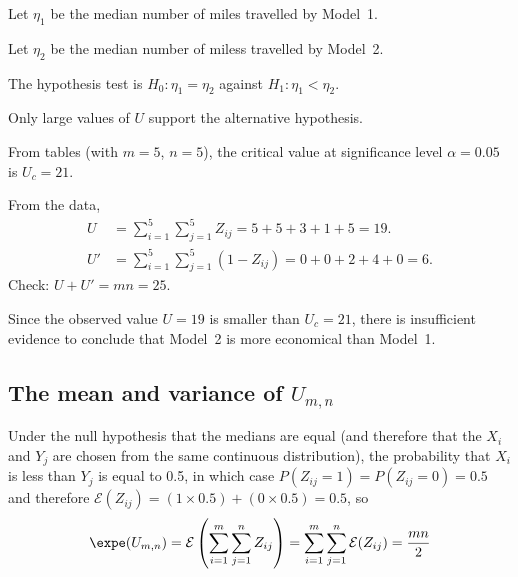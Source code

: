 \begin{solution}
Let $\eta_1$ be the median number of miles travelled by Model~1.
\par
Let $\eta_2$ be the median number of miless travelled by Model~2.
\par
The hypothesis test is $H_0:\eta_1=\eta_2$ against $H_1:\eta_1 < \eta_2$.
\par
Only large values of $U$ support the alternative hypothesis. 
\par 
From tables (with $m=5$, $n=5$), the critical value at significance level $\alpha=0.05$ is $U_c=21$. 
\par
From the data,
\begin{align*}
U 		& = \sum_{i=1}^5\sum_{j=1}^5 Z_{ij} = 5 + 5 + 3 + 1 + 5 = 19. \\
U'		& = \sum_{i=1}^5\sum_{j=1}^5 (1-Z_{ij}) = 0 + 0 + 2 + 4 + 0 = 6.
\end{align*}
Check: $U + U' = mn = 25$. 
\par
Since the observed value $U=19$ is smaller than $U_c=21$, there is insufficient evidence to conclude that Model~2 is more economical than Model~1. 

\end{solution}

\subsection{The mean and variance of $U_{m,n}$}

Under the null hypothesis that the medians are equal (and therefore that the $X_i$ and $Y_j$ are chosen from the same continuous distribution), the probability that $X_i$ is less than $Y_j$ is equal to 0.5, in which case $P(Z_{ij}=1)=P(Z_{ij}=0)=0.5$ and therefore $\mathcal{E}(Z_{ij})=(1\times 0.5)+(0\times 0.5)=0.5$, so
\[
\expe(U_{m,n}) 
	= \mathcal{E}\left(\sum_{i=1}^m\sum_{j=1}^n Z_{ij}\right)
	= \sum_{i=1}^m\sum_{j=1}^n \mathcal{E}(Z_{ij})
	= \frac{mn}{2}
\]

